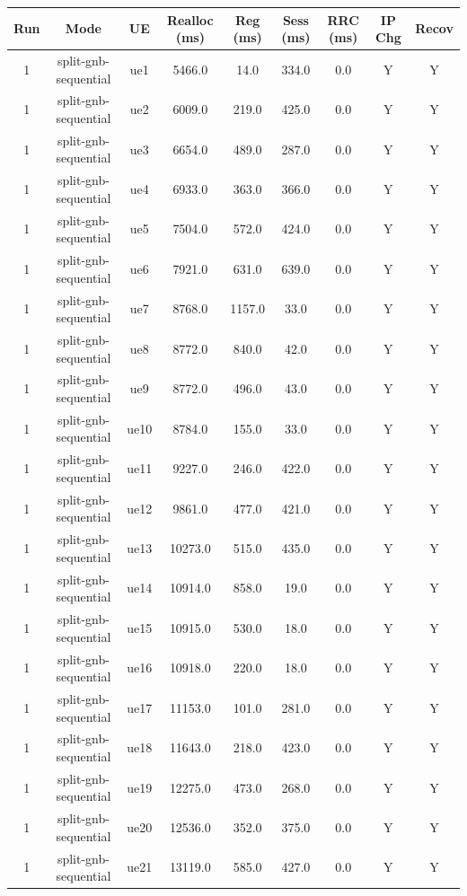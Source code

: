 \begin{table}[ht]
\centering
\begin{tabular}{|c|c|c|c|c|c|c|c|c|}
\hline
Run & Mode & UE & Realloc (ms) & Reg (ms) & Sess (ms) & RRC (ms) & IP Chg & Recov \\
\hline
1 & split-gnb-sequential & ue1 & 5466.0 & 14.0 & 334.0 & 0.0 & Y & Y \\
1 & split-gnb-sequential & ue2 & 6009.0 & 219.0 & 425.0 & 0.0 & Y & Y \\
1 & split-gnb-sequential & ue3 & 6654.0 & 489.0 & 287.0 & 0.0 & Y & Y \\
1 & split-gnb-sequential & ue4 & 6933.0 & 363.0 & 366.0 & 0.0 & Y & Y \\
1 & split-gnb-sequential & ue5 & 7504.0 & 572.0 & 424.0 & 0.0 & Y & Y \\
1 & split-gnb-sequential & ue6 & 7921.0 & 631.0 & 639.0 & 0.0 & Y & Y \\
1 & split-gnb-sequential & ue7 & 8768.0 & 1157.0 & 33.0 & 0.0 & Y & Y \\
1 & split-gnb-sequential & ue8 & 8772.0 & 840.0 & 42.0 & 0.0 & Y & Y \\
1 & split-gnb-sequential & ue9 & 8772.0 & 496.0 & 43.0 & 0.0 & Y & Y \\
1 & split-gnb-sequential & ue10 & 8784.0 & 155.0 & 33.0 & 0.0 & Y & Y \\
1 & split-gnb-sequential & ue11 & 9227.0 & 246.0 & 422.0 & 0.0 & Y & Y \\
1 & split-gnb-sequential & ue12 & 9861.0 & 477.0 & 421.0 & 0.0 & Y & Y \\
1 & split-gnb-sequential & ue13 & 10273.0 & 515.0 & 435.0 & 0.0 & Y & Y \\
1 & split-gnb-sequential & ue14 & 10914.0 & 858.0 & 19.0 & 0.0 & Y & Y \\
1 & split-gnb-sequential & ue15 & 10915.0 & 530.0 & 18.0 & 0.0 & Y & Y \\
1 & split-gnb-sequential & ue16 & 10918.0 & 220.0 & 18.0 & 0.0 & Y & Y \\
1 & split-gnb-sequential & ue17 & 11153.0 & 101.0 & 281.0 & 0.0 & Y & Y \\
1 & split-gnb-sequential & ue18 & 11643.0 & 218.0 & 423.0 & 0.0 & Y & Y \\
1 & split-gnb-sequential & ue19 & 12275.0 & 473.0 & 268.0 & 0.0 & Y & Y \\
1 & split-gnb-sequential & ue20 & 12536.0 & 352.0 & 375.0 & 0.0 & Y & Y \\
1 & split-gnb-sequential & ue21 & 13119.0 & 585.0 & 427.0 & 0.0 & Y & Y \\

\end{tabular}
\end{table}
